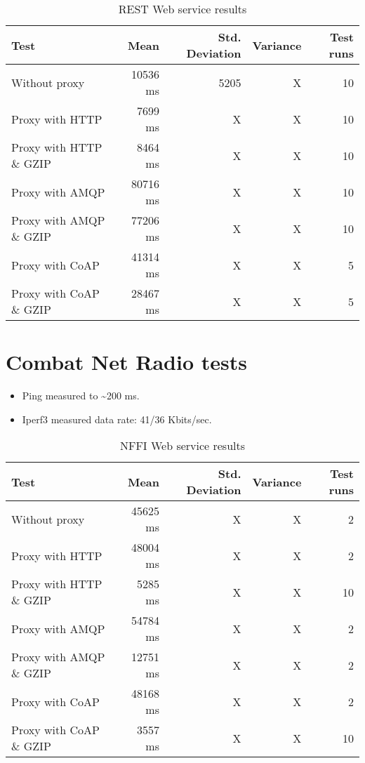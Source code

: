 \begin{appendices}
\begin{table}[H]
\begin{tabular}{| l | r | r | r | r |}
\hline
  \textbf{Test} & \textbf{Mean} & \textbf{Std. Deviation} & \textbf{Variance} & \textbf{Test runs}\\ \hline
  Without proxy & 10536 ms & 5205 & X & 10 \\ \hline
  Proxy with HTTP & 7699 ms & X & X & 10 \\ \hline
  Proxy with HTTP \& GZIP & 8464 ms & X & X & 10 \\ \hline
  Proxy with AMQP & 80716 ms & X & X & 10 \\ \hline
  Proxy with AMQP \& GZIP & 77206 ms & X & X & 10\\ \hline
  Proxy with CoAP & 41314 ms & X & X & 5 \\ \hline
  Proxy with CoAP \& GZIP & 28467 ms & X & X & 5 \\ \hline
\end{tabular}
\caption{REST Web service results}
\end{table}


\section{Combat Net Radio tests}

\begin{itemize}
	\item Ping measured to \textasciitilde 200 ms.
	\item Iperf3 measured data rate: 41/36 Kbits/sec.
\end{itemize}

\begin{table}[H]
\begin{tabular}{| l | r | r | r | r |}
\hline
  \textbf{Test} & \textbf{Mean} & \textbf{Std. Deviation} & \textbf{Variance} & \textbf{Test runs}\\ \hline
  Without proxy & 45625 ms & X & X & 2 \\ \hline
  Proxy with HTTP & 48004 ms & X & X & 2 \\ \hline
  Proxy with HTTP \& GZIP & 5285 ms & X & X & 10 \\ \hline
  Proxy with AMQP & 54784 ms & X & X & 2 \\ \hline
  Proxy with AMQP \& GZIP & 12751 ms & X & X & 2\\ \hline
  Proxy with CoAP & 48168 ms & X & X & 2 \\ \hline
  Proxy with CoAP \& GZIP & 3557 ms & X & X & 10 \\ \hline
\end{tabular}
\caption{NFFI Web service results}
\end{table}



\end{appendices}
